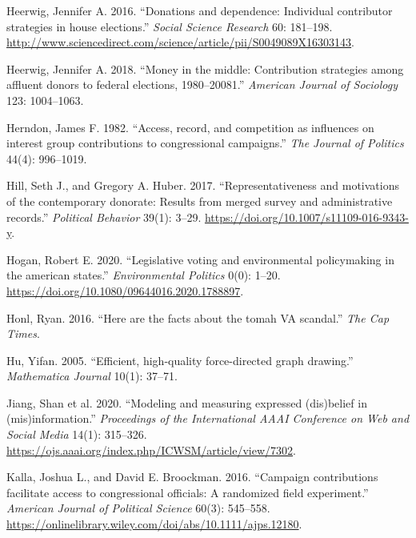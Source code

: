 \documentclass[12pt,]{article}
\begin{document}
\begin{CSLReferences}{1}{0}
\leavevmode{}%
Heerwig, Jennifer A. 2016. {``Donations and dependence: Individual
contributor strategies in house elections.''} \emph{Social Science
Research} 60: 181--198.
\url{http://www.sciencedirect.com/science/article/pii/S0049089X16303143}.

\leavevmode{}%
Heerwig, Jennifer A. 2018. {``Money in the middle: Contribution
strategies among affluent donors to federal elections, 1980--20081.''}
\emph{American Journal of Sociology} 123: 1004--1063.

\leavevmode{}%
Herndon, James F. 1982. {``Access, record, and competition as influences
on interest group contributions to congressional campaigns.''} \emph{The
Journal of Politics} 44(4): 996--1019.

\leavevmode{}%
Hill, Seth J., and Gregory A. Huber. 2017. {``Representativeness and
motivations of the contemporary donorate: Results from merged survey and
administrative records.''} \emph{Political Behavior} 39(1): 3--29.
\url{https://doi.org/10.1007/s11109-016-9343-y}.

\leavevmode{}%
Hogan, Robert E. 2020. {``Legislative voting and environmental
policymaking in the american states.''} \emph{Environmental Politics}
0(0): 1--20. \url{https://doi.org/10.1080/09644016.2020.1788897}.

\leavevmode{}%
Honl, Ryan. 2016. {``Here are the facts about the tomah VA scandal.''}
\emph{The Cap Times}.

\leavevmode{}%
Hu, Yifan. 2005. {``Efficient, high-quality force-directed graph
drawing.''} \emph{Mathematica Journal} 10(1): 37--71.

\leavevmode{}%
Jiang, Shan et al. 2020. {``Modeling and measuring expressed (dis)belief
in (mis)information.''} \emph{Proceedings of the International AAAI
Conference on Web and Social Media} 14(1): 315--326.
\url{https://ojs.aaai.org/index.php/ICWSM/article/view/7302}.

\leavevmode{}%
Kalla, Joshua L., and David E. Broockman. 2016. {``Campaign
contributions facilitate access to congressional officials: A randomized
field experiment.''} \emph{American Journal of Political Science} 60(3):
545--558.
\url{https://onlinelibrary.wiley.com/doi/abs/10.1111/ajps.12180}.


\end{CSLReferences}
\end{document}
